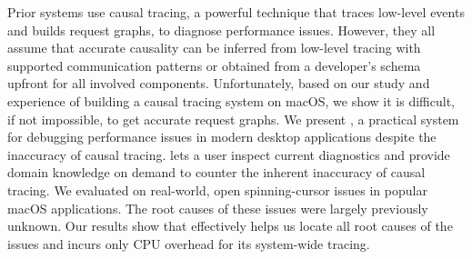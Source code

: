 Prior systems use causal tracing, a powerful technique that traces low-level
events and builds request graphs, to diagnose performance issues. However, they
all assume that accurate causality can be inferred from low-level tracing with
supported communication patterns or obtained from a developer's schema upfront
for all involved components.  Unfortunately, based on our study and experience
of building a causal tracing system on macOS, we show it is difficult, if not
impossible, to get accurate request graphs.
We present \xxx, a practical system for debugging performance issues in modern
desktop applications despite the inaccuracy of causal tracing. \xxx lets a user
inspect current diagnostics and provide domain knowledge on demand to counter
the inherent inaccuracy of causal tracing. We evaluated \xxx on \nbug
real-world, open spinning-cursor issues in popular macOS applications. The
root causes of these issues were largely previously unknown.  Our results
show that \xxx effectively helps us locate all root causes of the issues
and incurs only \cpuoverhead CPU overhead for its system-wide tracing.
